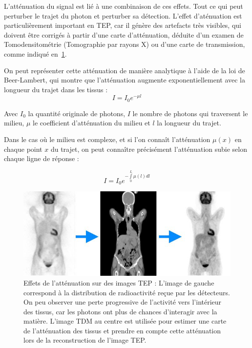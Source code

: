 L'atténuation du signal est lié à une combinaison de ces effets. Tout ce qui peut perturber le trajet du photon et perturber sa détection. L'effet d'aténuation est particulièrement important en TEP, car il génère des artefacts très visibles, qui doivent être corrigés à partir d'une carte d'atténuation, déduite d'un examen de Tomodensitométrie (Tomographie par rayons X) ou d'une carte de transmission, comme indiqué en~\ref{fig:schemaAtt}.


On peut représenter cette atténuation de manière analytique à l'aide de la loi de Beer-Lambert, qui montre que l'atténuation augmente exponentiellement avec la longueur du trajet dans les tissus :
\begin{equation}
I = I_0 e^{-\mu l}
\end{equation}

Avec $I_0$ la quantité originale de photons, $I$ le nombre de photons qui traversent le milieu, $\mu$ le coefficient d'atténuation du milieu et $l$ la longueur du trajet. 

Dans le cas où le milieu est complexe, et si l'on connaît l'atténuation $\mu(x)$ en chaque point $x$ du trajet, on peut connaître précisément l'atténuation subie selon chaque ligne de réponse :

\begin{equation}
I = I_0 e^{- \int\limits^L_0 \mu(l) dl}
\end{equation}


\begin{figure}
\centering
\includegraphics[width=12cm]{images/attenuationNonAtt}
\caption[Effet de l'atténuation sur les images TEP]{Effets de l'atténuation sur des images TEP : L'image de gauche correspond à la distribution de radioactivité reçue par les détecteurs. On peu observer une perte progressive de l'activité vers l'intérieur des tissus, car les photons ont plus de chances d'interagir avec la matière. L'image TDM au centre est utilisée pour estimer une carte de l'atténuation des tissus et prendre en compte cette atténuation lors de la reconstruction de l'image TEP.}
\label{fig:schemaAtt}
\end{figure}

